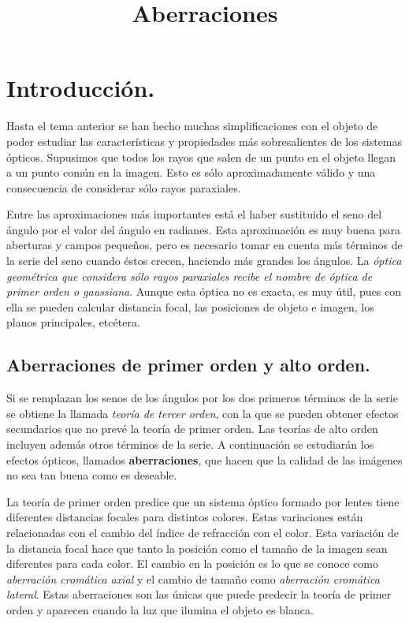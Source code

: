 \documentclass[14pt]{extarticle}
\title{\vspace*{-2cm} Aberraciones}
\date{ }
\begin{document}
\maketitle

\section{Introducción.}

Hasta el tema anterior se han hecho muchas simplificaciones con el objeto de poder estudiar las características y propiedades más sobresalientes de los sistemas ópticos. Supusimos que todos los rayos que salen de un punto en el objeto llegan a un punto común en la imagen. Esto es sólo aproximadamente válido y una consecuencia de considerar sólo rayos paraxiales.

Entre las aproximaciones más importantes está el haber sustituido el seno del ángulo por el valor del ángulo en radianes. Esta aproximación es muy buena para aberturas y campos pequeños, pero es necesario tomar en cuenta más términos de la serie del seno cuando éstos crecen, haciendo más grandes los ángulos. La \textit{óptica geométrica que considera sólo rayos paraxiales recibe el nombre de óptica de primer orden o gaussiana}. Aunque esta óptica no es exacta, es muy útil, pues con ella se pueden calcular distancia focal, las posiciones de objeto e imagen, los planos principales, etcétera.

\subsection{Aberraciones de primer orden y alto orden.}

Si se remplazan los senos de los ángulos por los dos primeros términos de la serie se obtiene la llamada \textit{teoría de tercer orden}, con la que se pueden obtener efectos secundarios que no prevé la teoría de primer orden. Las teorías de alto orden incluyen además otros términos de la serie. A continuación se estudiarán los efectos ópticos, llamados \textbf{aberraciones}, que hacen que la calidad de las imágenes no sea tan buena como es deseable.

La teoría de primer orden predice que un sistema óptico formado por lentes tiene diferentes distancias focales para distintos colores. Estas variaciones están relacionadas con el cambio del índice de refracción con el color. Esta variación de la distancia focal hace que tanto la posición como el tamaño de la imagen sean diferentes para cada color. El cambio en la posición es lo que se conoce como \textit{aberración cromática axial} y el cambio de tamaño como \textit{aberración cromática lateral}. Estas aberraciones son las únicas que puede predecir la teoría de primer orden y aparecen cuando la luz que ilumina el objeto es blanca.
\end{document}
